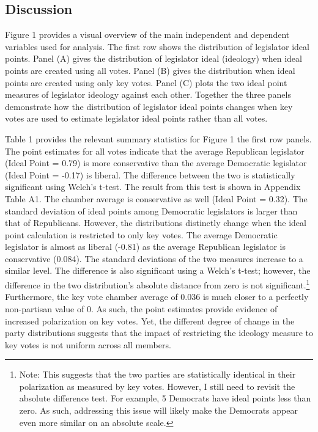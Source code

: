 \documentclass[10pt,letterpaper]{article}
\begin{document}
\subsection{Discussion}
Figure 1 provides a visual overview of the main independent and dependent variables used for analysis. The first row shows the distribution of legislator ideal points. Panel (A) gives the distribution of legislator ideal (ideology) when ideal points are created using all votes. Panel (B) gives the distribution when ideal points are created using only key votes. Panel (C) plots the two ideal point measures of legislator ideology against each other. Together the three panels demonstrate how the distribution of legislator ideal points changes when key votes are used to estimate legislator ideal points rather than all votes.
 
Table 1 provides the relevant summary statistics for Figure 1 the first row panels. The point estimates for all votes indicate that the average Republican legislator (Ideal Point = 0.79) is more conservative than the average Democratic legislator (Ideal Point = -0.17) is liberal. The difference between the two is statistically significant using Welch's t-test. The result from this test is shown in Appendix Table A1. The chamber average is conservative as well (Ideal Point = 0.32). The standard deviation of ideal points among Democratic legislators is larger than that of Republicans. However, the distributions distinctly change when the ideal point calculation is restricted to only key votes. The average Democratic legislator is almost as liberal (-0.81) as the average Republican legislator is conservative (0.084). The standard deviations of the two measures increase to a similar level. The difference is also significant using a Welch's t-test; however, the difference in the two distribution's absolute distance from zero is not significant.\footnote{Note: This suggests that the two parties are statistically identical in their polarization as measured by key votes. However, I still need to revisit the absolute difference test. For example, 5 Democrats have ideal points less than zero. As such, addressing this issue will likely make the Democrats appear even more similar on an absolute scale.} Furthermore, the key vote chamber average of 0.036 is much closer to a perfectly non-partisan value of 0. As such, the point estimates provide evidence of increased polarization on key votes. Yet, the different degree of change in the party distributions suggests that the impact of restricting the ideology measure to key votes is not uniform across all members.
\end{document}
